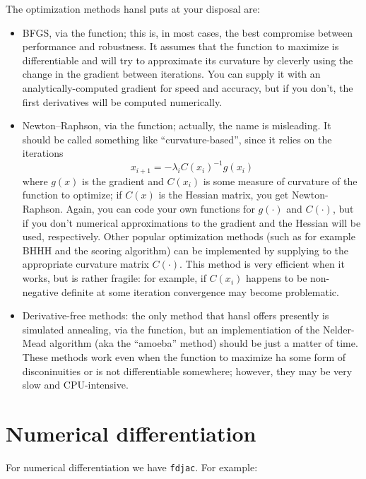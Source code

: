 The optimization methods hansl puts at your disposal are:
\begin{itemize}
\item BFGS, via the  function; this is, in most cases,
  the best compromise between performance and robustness. It assumes
  that the function to maximize is differentiable and will try to
  approximate its curvature by cleverly using the change in the
  gradient between iterations. You can supply it with an
  analytically-computed gradient for speed and accuracy, but if you
  don't, the first derivatives will be computed numerically. 
\item Newton--Raphson, via the  function; actually, the
  name is misleading. It should be called something like
  ``curvature-based'', since it relies on the iterations
  \[
    x_{i+1} = -\lambda_i C(x_i)^{-1} g(x_i)
  \]
  where $g(x)$ is the gradient and $C(x_i)$ is some measure of
  curvature of the function to optimize; if $C(x)$ is the Hessian
  matrix, you get Newton-Raphson. Again, you can code your own
  functions for $g(\cdot)$ and $C(\cdot)$, but if you don't numerical
  approximations to the gradient and the Hessian will be used,
  respectively. Other popular optimization methods (such as for
  example BHHH and the scoring algorithm) can be implemented by
  supplying to the appropriate curvature matrix
  $C(\cdot)$. This method is very efficient when it works, but is
  rather fragile: for example, if $C(x_i)$ happens to be non-negative
  definite at some iteration convergence may become problematic.
\item Derivative-free methods: the only method that hansl offers
  presently is simulated annealing, via the  function,
  but an implementiation of the Nelder-Mead algorithm (aka the
  ``amoeba'' method) should be just a matter of time. These methods
  work even when the function to maximize ha some form of
  disconinuities or is not differentiable somewhere; however, they may
  be very slow and CPU-intensive.
\end{itemize}

\section{Numerical differentiation}
\label{sec:hp-numdiff}

For numerical differentiation we have \texttt{fdjac}. For example:

